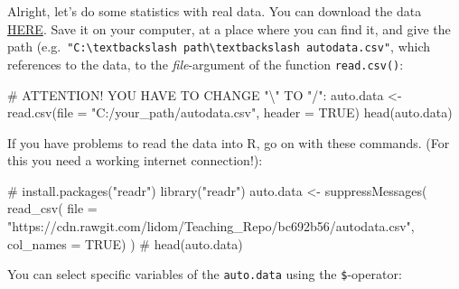 \documentclass[
  letterpaper,
  DIV=11,
  numbers=noendperiod]{scrreprt}
\newenvironment{Shaded}{\begin{snugshade}}{\end{snugshade}}
\newcommand{\AlertTok}[1]{\textcolor[rgb]{0.68,0.00,0.00}{#1}}
\newcommand{\AttributeTok}[1]{\textcolor[rgb]{0.40,0.45,0.13}{#1}}
\newcommand{\CommentTok}[1]{\textcolor[rgb]{0.37,0.37,0.37}{#1}}
\newcommand{\ConstantTok}[1]{\textcolor[rgb]{0.56,0.35,0.01}{#1}}
\newcommand{\DocumentationTok}[1]{\textcolor[rgb]{0.37,0.37,0.37}{\textit{#1}}}
\newcommand{\FunctionTok}[1]{\textcolor[rgb]{0.28,0.35,0.67}{#1}}
\newcommand{\NormalTok}[1]{\textcolor[rgb]{0.00,0.23,0.31}{#1}}
\newcommand{\OtherTok}[1]{\textcolor[rgb]{0.00,0.23,0.31}{#1}}
\newcommand{\SpecialCharTok}[1]{\textcolor[rgb]{0.37,0.37,0.37}{#1}}
\newcommand{\StringTok}[1]{\textcolor[rgb]{0.13,0.47,0.30}{#1}}
\theoremstyle{definition}
\theoremstyle{plain}
\theoremstyle{plain}
\theoremstyle{remark}
\begin{document}
Alright, let's do some statistics with real data. You can download the
data \href{https://github.com/lidom/Teaching_Repo}{HERE}. Save it on
your computer, at a place where you can find it, and give the path
(e.g.~\texttt{"C:\textbackslash{}textbackslash\ path\textbackslash{}textbackslash\ autodata.csv"},
which references to the data, to the \emph{file}-argument of the
function \texttt{read.csv()}:

\begin{Shaded}
\begin{Highlighting}[]
\CommentTok{\# }\AlertTok{ATTENTION}\CommentTok{! YOU HAVE TO CHANGE "\textbackslash{}" TO "/":}
\NormalTok{auto.data }\OtherTok{\textless{}{-}} \FunctionTok{read.csv}\NormalTok{(}\AttributeTok{file   =} \StringTok{"C:/your\_path/autodata.csv"}\NormalTok{, }
                      \AttributeTok{header =} \ConstantTok{TRUE}\NormalTok{)}
\FunctionTok{head}\NormalTok{(auto.data)}
\end{Highlighting}
\end{Shaded}

\hfill\break

If you have problems to read the data into R, go on with these commands.
(For this you need a working internet connection!):

\begin{Shaded}
\begin{Highlighting}[]
\CommentTok{\# install.packages("readr")}
\FunctionTok{library}\NormalTok{(}\StringTok{"readr"}\NormalTok{)}
\NormalTok{auto.data }\OtherTok{\textless{}{-}} \FunctionTok{suppressMessages}\NormalTok{(}
  \FunctionTok{read\_csv}\NormalTok{(}
  \AttributeTok{file =} \StringTok{"https://cdn.rawgit.com/lidom/Teaching\_Repo/bc692b56/autodata.csv"}\NormalTok{,}
  \AttributeTok{col\_names =} \ConstantTok{TRUE}\NormalTok{)}
\NormalTok{)}
\CommentTok{\# head(auto.data)}
\end{Highlighting}
\end{Shaded}

\hfill\break

You can select specific variables of the \texttt{auto.data} using the
\texttt{\$}-operator:

\begin{Shaded}
\end{Shaded}
\end{document}
